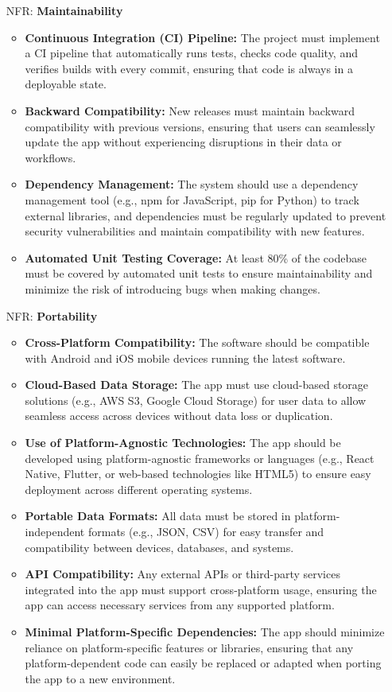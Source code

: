 \documentclass[12pt]{article}
\newcounter{frnum} %
\newcounter{nfrnum} %
\begin{document}
\begin{itemize}
\item[NFR\refstepcounter{nfrnum}\thenfrnum \label{NFR_Maintainability}:] \textbf{Maintainability}
\begin{itemize}
	\item \textbf{Continuous Integration (CI) Pipeline:} The project must implement a CI pipeline that automatically runs tests, checks code quality, and verifies builds with every commit, ensuring that code is always in a deployable state.
	\item \textbf{Backward Compatibility:} New releases must maintain backward compatibility with previous versions, ensuring that users can seamlessly update the app without experiencing disruptions in their data or workflows.
	\item \textbf{Dependency Management:} The system should use a dependency management tool (e.g., npm for JavaScript, pip for Python) to track external libraries, and dependencies must be regularly updated to prevent security vulnerabilities and maintain compatibility with new features.
	\item \textbf{Automated Unit Testing Coverage:} At least 80\% of the codebase must be covered by automated unit tests to ensure maintainability and minimize the risk of introducing bugs when making changes.
\end{itemize}

\item[NFR\refstepcounter{nfrnum}\thenfrnum \label{NFR_Portability}:] \textbf{Portability} 
\begin{itemize}
	\item \textbf{Cross-Platform Compatibility:} The software should be compatible with Android and iOS mobile devices running the latest software.
	\item \textbf{Cloud-Based Data Storage:} The app must use cloud-based storage solutions (e.g., AWS S3, Google Cloud Storage) for user data to allow seamless access across devices without data loss or duplication.
	\item \textbf{Use of Platform-Agnostic Technologies:} The app should be developed using platform-agnostic frameworks or languages (e.g., React Native, Flutter, or web-based technologies like HTML5) to ensure easy deployment across different operating systems.
	\item \textbf{Portable Data Formats:} All data must be stored in platform-independent formats (e.g., JSON, CSV) for easy transfer and compatibility between devices, databases, and systems.
	\item \textbf{API Compatibility:} Any external APIs or third-party services integrated into the app must support cross-platform usage, ensuring the app can access necessary services from any supported platform.
	\item \textbf{Minimal Platform-Specific Dependencies:} The app should minimize reliance on platform-specific features or libraries, ensuring that any platform-dependent code can easily be replaced or adapted when porting the app to a new environment.
\end{itemize}


\end{itemize}
\end{document}
